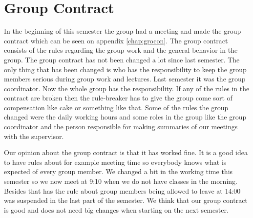 \section{Group Contract}
In the beginning of this semester the group had a meeting and made the group contract which can be seen on appendix \ref{chap:grocon}. The group contract consists of the rules regarding the group work and the general behavior in the group. The group contract has not been changed a lot since last semester. The only thing that has been changed is who has the responsibility to keep the group members serious during group work and lectures. Last semester it was the group coordinator. Now the whole group has the responsibility. If any of the rules in the contract are broken then the rule-breaker has to give the group come sort of compensation like cake or something like that. Some of the rules the group changed were the daily working hours and some roles in the group like the group coordinator and the person responsible for making summaries of our meetings with the supervisor. 

Our opinion about the group contract is that it has worked fine. It is a good idea to have rules about for example meeting time so everybody knows what is expected of every group member. We changed a bit in the working time this semester so we now meet at 9:10 when we do not have classes in the morning. Besides that has the rule about group members being allowed to leave at 14:00 was suspended in the last part of the semester. We think that our group contract is good and does not need big changes when starting on the next semester.
